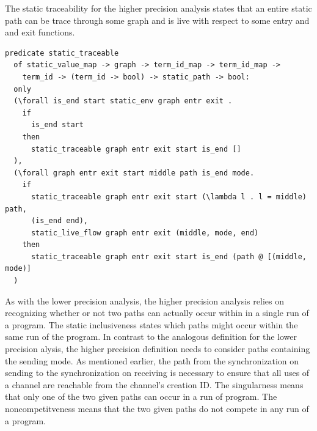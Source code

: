 \documentclass[10pt]{article}
\begin{document}
The static traceability for the higher precision analysis states
that an entire static path can be trace through some graph and
is live with respect to some entry and and exit functions.

\begin{lstlisting}[language=logic, mathescape]
  predicate static_traceable
  of static_value_map -> graph -> term_id_map -> term_id_map ->
    term_id -> (term_id -> bool) -> static_path -> bool:
  only
  (\forall is_end start static_env graph entr exit .
    if
      is_end start
    then
      static_traceable graph entr exit start is_end []
  ),
  (\forall graph entr exit start middle path is_end mode. 
    if
      static_traceable graph entr exit start (\lambda l . l = middle) path, 
      (is_end end),
      static_live_flow graph entr exit (middle, mode, end) 
    then
      static_traceable graph entr exit start is_end (path @ [(middle, mode)]
  )
\end{lstlisting}

As with the lower precision analysis, the higher precision analysis relies on recognizing
whether or not two paths can actually occur within in a single run of a program. The static
inclusiveness states which paths might occur within the same run of the program.
In contrast to the analogous definition for the lower precision
alysis, the higher precision definition needs to consider paths containing the
sending mode.  As mentioned earlier, the path from the synchronization on sending to the
synchronization on receiving is necessary to ensure that all uses of a channel are reachable
from the channel's creation ID.  The singularness means that only one of the two
given paths can occur in a run of program.  The noncompetitveness means that the two
given paths do not compete in any run of a program. 
\end{document}
